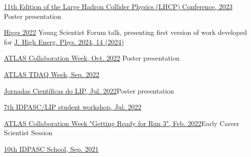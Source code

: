 \begin{cventries}
    {}
    {}
    {\href{https://indico.cern.ch/event/1198609/contributions/5340462/}{11th Edition of the Large Hadron Collider Physics (LHCP) Conference, 2023 }}
    {Poster presentation}\vspace*{2mm}

    {}
    {}
    {\href{https://indico.cern.ch/event/1086716/contributions/5049260/}{Higgs 2022}}
    {Young Scientist Forum talk, presenting first version of work developed for \href{https://doi.org/10.1007/JHEP04(2024)014}{J. High Energ. Phys. 2024, 14 (2024)}}\vspace*{2mm}

    {}
    {}
    {\href{https://indico.cern.ch/event/1187086/\#37-the-atlas-jet-trigger-in-ru}{ATLAS Collaboration Week, Oct. 2022}}
    {Poster presentation}\vspace*{2mm}

    {}
    {}
    {\href{https://indico.cern.ch/event/1172448/contributions/4924082/}{ATLAS TDAQ Week, Sep. 2022}}
    {}\vspace*{2mm}

    {\href{https://indico.lip.pt/event/1183/}{Jornadas Científicas do LIP, Jul. 2022}}{Poster presentation}

    {\href{https://indico.lip.pt/event/1245/}{7th IDPASC/LIP student workshop, Jul. 2022}}{}

    {}
    {}
    {\href{https://indico.cern.ch/event/1108354/\#167-readiness-of-the-jet-trigg}{ATLAS Collaboration Week "Getting Ready for Run 3", Feb. 2022}}{Early Career Scientist Session}
    
    
    {}{\href{https://indico.lip.pt/event/643}{10th IDPASC School, Sep. 2021}}{}


\end{cventries}
